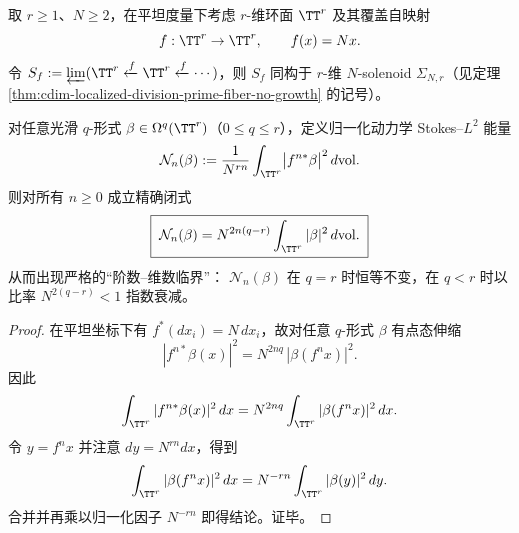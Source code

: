 
\begin{theorem}\label{thm:app-solenoid-normalized-stokes-l2-scaling-critical-degree}
取 \(r\ge 1\)、\(N\ge 2\)，在平坦度量下考虑 \(r\)-维环面 \(\TT^r\) 及其覆盖自映射
\[
f:\TT^r\to\TT^r,\qquad f(x)=Nx.
\]
令 \(S_f:=\varprojlim(\TT^r\xleftarrow{f}\TT^r\xleftarrow{f}\cdots)\)，则 \(S_f\) 同构于 \(r\)-维 \(N\)-solenoid \(\Sigma_{N,r}\)（见定理 \ref{thm:cdim-localized-division-prime-fiber-no-growth} 的记号）。
\par
对任意光滑 \(q\)-形式 \(\beta\in\Omega^q(\TT^r)\)（\(0\le q\le r\)），定义归一化动力学 Stokes--\(L^2\) 能量
\[
\mathcal N_n(\beta)
:=
\frac{1}{N^{rn}}\int_{\TT^r}\bigl|f^{n\ast}\beta\bigr|^{2}\,d\mathrm{vol}.
\]
则对所有 \(n\ge 0\) 成立精确闭式
\[
\boxed{\;
\mathcal N_n(\beta)
=
N^{2n(q-r)}\int_{\TT^r}|\beta|^{2}\,d\mathrm{vol}.\;}
\]
从而出现严格的“阶数--维数临界”：
\(\mathcal N_n(\beta)\) 在 \(q=r\) 时恒等不变，在 \(q<r\) 时以比率 \(N^{2(q-r)}<1\) 指数衰减。
\end{theorem}

\begin{proof}
在平坦坐标下有 \(f^\ast(dx_i)=N\,dx_i\)，故对任意 \(q\)-形式 \(\beta\) 有点态伸缩
\[
|f^{n\ast}\beta(x)|^{2}
=N^{2nq}\,|\beta(f^{n}x)|^{2}.
\]
因此
\[
\int_{\TT^r}|f^{n\ast}\beta(x)|^{2}\,dx
=N^{2nq}\int_{\TT^r}|\beta(f^{n}x)|^{2}\,dx.
\]
令 \(y=f^{n}x\) 并注意 \(dy=N^{rn}dx\)，得到
\[
\int_{\TT^r}|\beta(f^{n}x)|^{2}\,dx
=N^{-rn}\int_{\TT^r}|\beta(y)|^{2}\,dy.
\]
合并并再乘以归一化因子 \(N^{-rn}\) 即得结论。证毕。
\end{proof}

\endinput
